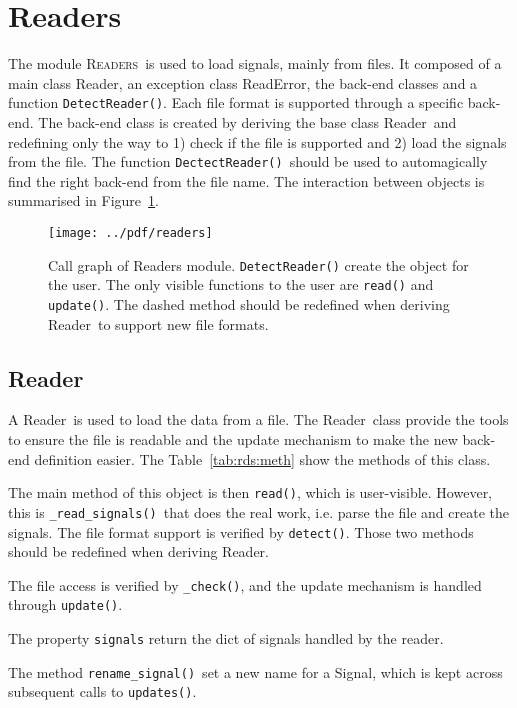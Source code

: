 \documentclass[a4paper,11pt]{article}
\newcommand{\meth}[1]{\texttt{#1()}}
\newcommand{\cls}[1]{\textsf{#1}}
\newcommand{\prop}[1]{\texttt{#1}}
\newcommand{\sig}{\cls{Signal}}
\newcommand{\rd}{\cls{Reader}}
\newcommand{\rderr}{\cls{ReadError}}
\newcommand{\module}[1]{\textsc{#1}}
\begin{document}
\section{Readers}
\label{sec:readers}
The module \module{Readers}\ is used to load signals, mainly from files.
It composed of a main class \rd, an exception class \rderr, the back-end classes and a function \meth{DetectReader}.
Each file format is supported through a specific back-end.
The back-end class is created by deriving the base class \rd\ and redefining only the way to 1) check if the file is supported and 2) load the signals from the file.
The function \meth{DectectReader}\ should be used to automagically find the right back-end from the file name.
The interaction between objects is summarised in Figure~\ref{fig:rds:callgraph}.

\begin{figure}[htbp]
  \centering
  \texttt{[image: ../pdf/readers]}
  \caption{Call graph of Readers module. \meth{DetectReader} create the object for the user. The only visible functions to the user are \meth{read} and \meth{update}. The dashed method should be redefined when deriving \rd\ to support new file formats.}
  \label{fig:rds:callgraph}
\end{figure}

\subsection{Reader}
\label{sec:readers:reader}
 
A \rd\ is used to load the data from a file.
The \rd\ class provide the tools to ensure the file is readable and the update mechanism to make the new back-end definition easier.
The Table~\ref{tab:rds:meth} show the methods of this class.

The main method of this object is then \meth{read}, which is user-visible.
However, this is \meth{\_read\_signals}\ that does the real work, i.e. parse the file and create the signals.
The file format support is verified by \meth{detect}.
Those two methods should be redefined when deriving \rd.

The file access is verified by \meth{\_check}, and the update mechanism is handled through \meth{update}.

The property \prop{signals} return the dict of signals handled by the reader.

The method \meth{rename\_signal}\ set a new name for a \sig, which is kept across subsequent calls to \meth{updates}.
\end{document}
